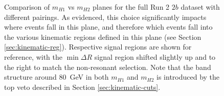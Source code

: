 \begin{figure}[ht]
\centering
{}

\caption{\label{fig:pairing-massplanes} Comparison of $m_{H1}$ vs $m_{H2}$ planes for the full Run 2 $2b$ 
dataset with different pairings. As evidenced, this choice significantly impacts where events 
fall in this plane, and therefore which events fall into the various kinematic regions defined in 
this plane (see Section \ref{sec:kinematic-reg}). Respective signal regions are shown for reference, 
with the $\min\Delta R$ signal region shifted slightly up and to the right to match the non-resonant 
selection. Note that the band structure around \SI{80}{\GeV} in both $m_{H1}$ and $m_{H2}$ is introduced 
by the top veto described in Section \ref{sec:kinematic-cuts}.}
\end{figure}


